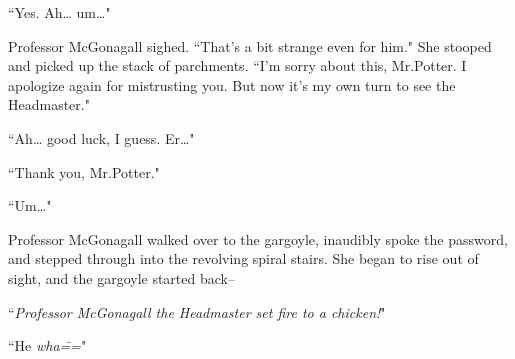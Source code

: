 ``Yes. Ah{\ldots} um{\ldots}"

Professor McGonagall sighed. ``That's a bit strange even for him." She stooped and picked up the stack of parchments. ``I'm sorry about this, Mr.\?Potter. I apologize again for mistrusting you. But now it's my own turn to see the Headmaster."

``Ah{\ldots} good luck, I guess. Er{\ldots}"

``Thank you, Mr.\?Potter."

``Um{\ldots}"

Professor McGonagall walked over to the gargoyle, inaudibly spoke the password, and stepped through into the revolving spiral stairs. She began to rise out of sight, and the gargoyle started back\---

``\emph{Professor McGonagall the Headmaster set fire to a chicken!}"

``He \emph{wha\===}"

